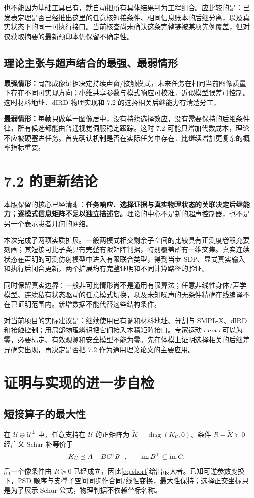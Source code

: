 \documentclass[UTF8,fontset=fandol,11pt,a4paper]{ctexart}
\DeclareMathOperator{\diag}{diag}\DeclareMathOperator{\tr}{tr}\DeclareMathOperator{\TV}{TV}
\theoremstyle{definition}\newtheorem{definition}[theorem]{定义}\newtheorem{assumption}[theorem]{条件}
\numberwithin{equation}{section}
\begin{document}
也不能因为基础工具已有，就自动把所有具体结果判为工程组合。应比较的是：已发表定理是否已经推出这里的任意核短接条件、相同信息账本的后继分离，以及真实状态下的同一可执行接口。当前核查尚未确认这条完整链被某项先例覆盖，但对仅获取摘要的最新预印本仍保留不确定性。

\subsection{理论主张与超声结合的最强、最弱情形}
\textbf{最强情形：}局部成像证据决定持续声窗/接触模式，未来任务在相同当前图像质量下存在不同可实现方向；小维共享参数与模式响应可校准，近似模型误差可控制。这时材料地址、dIRD 物理实现和 7.2 的选择相关后继能力有清楚分工。

\textbf{最弱情形：}每帧只做单一图像居中，没有持续选择效应，没有需要保持的后继条件律，所有候选都能由普通视觉伺服稳定跟踪。这时 7.2 可能只增加代数成本，理论不应被硬塞进任务。首先确认机制是否在实际任务中存在，比继续增加更复杂的概率指标重要。

\section{7.2 的更新结论}
\label{sec:conclusion}
本版保留的核心已经清晰：\textbf{任务响应、选择证据与真实物理状态的关联决定后继能力；逐模式信息矩阵不足以独立描述它。}理论的中心不是新的超声控制器，也不是另一个表示患者几何的网络。

本次完成了两项实质扩展。一般两模式相交剩余子空间的比较具有正测度卷积充要刻画；其短接可比子类具有完整有限矩阵判据，特别覆盖所有一维交集。真实连续状态在声明的可测仿射模型中进入有限联合类型，得到当步 SDP、显式真实输入和执行后闭合更新。两个扩展均有完整证明和不同计算路径的验证。

同时保留真实边界：一般非可比情形尚不是通用有限算法；任意非线性身体/声学模型、连续私有状态驱动的任意模式切换，以及未知噪声的无条件精确在线编译不在已证明范围内。新增数据不能代替这些结构条件。

对当前项目的实际建议是：继续使用已有调和材料地址、分割与 SMPL-X、dIRD 和接触控制；用局部物理辨识把它们接入本稿矩阵接口。专家运动 demo 可以为零，必要标定、有效观测和安全模型不能为零。先在体模上证明选择相关的后继差异确实出现，再决定是否把 7.2 作为通用理论论文的主要应用。

\appendix
\section{证明与实现的进一步自检}
\label{app:checks}
\subsection{短接算子的最大性}
在 $\mathcal U\oplus\mathcal U^\perp$ 中，任意支持在 $\mathcal U$ 的正矩阵为 $\widetilde K=\diag(K_U,0)$。条件 $R-\widetilde K\succeq0$ 经广义 Schur 补等价于
\[
K_U\preceq A-BC^\dagger B^\top,
\qquad\operatorname{im} B^\top\subseteq\operatorname{im} C.
\]
后一个像条件由 $R\succeq0$ 已经成立，因此\eqref{eq:short}给出最大者。已知可逆参数变换下，PSD 顺序与支撑子空间同步作合同/线性变换，最大性保持；选择正交坐标只是为了展示 Schur 公式，物理判据不依赖坐标名称。
\end{document}
